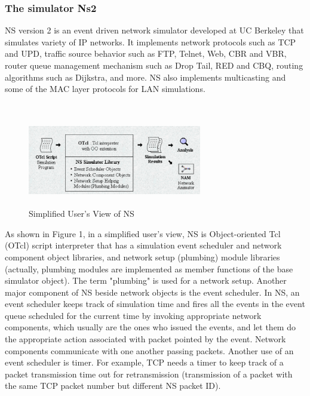 {{{\subsubsection{The simulator Ns2}{
NS version 2 is an event driven network simulator developed at UC Berkeley that simulates variety of IP networks. It implements network protocols such as TCP and UPD, traffic source behavior such as FTP, Telnet, Web, CBR and VBR, router queue management mechanism such as Drop Tail, RED and CBQ, routing algorithms such as Dijkstra, and more. NS also implements multicasting and some of the MAC layer protocols for LAN simulations.\\\\
\begin{figure}[!htb]
	\includegraphics[width=7.6cm,height=4.0cm]{figura4}
	\caption{Simplified User's View of NS}
	\label{figure}
\end{figure}As shown in Figure 1, in a simplified user's view, NS is Object-oriented Tcl (OTcl) script interpreter that has a simulation event scheduler and network component object libraries, and network setup (plumbing) module libraries (actually, plumbing modules are implemented as member functions of the base simulator object).  The term "plumbing" is used for a network setup.
Another major component of NS beside network objects is the event scheduler. In NS, an event scheduler keeps track of simulation time and fires all the events in the event queue scheduled for the current time by invoking appropriate network components, which usually are the ones who issued the events, and let them do the appropriate action associated with packet pointed by the event. Network components communicate with one another passing packets. Another use of an event scheduler is timer. For example, TCP needs a timer to keep track of a packet transmission time out for retransmission (transmission of a packet with the same TCP packet number but different NS packet ID). 

}
}}}
